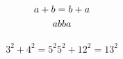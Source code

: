 \documentclass{article}
\begin{document}
    \begin{gather} %
            a+b = b+a \\
            ab ba \notag %

    \end{gather}

    \begin{gather*}
                3^2 + 4^2 = 5^2
                5^2 + 12^2 = 13^2
    \end{gather*}
    
    \begin{align} %
    
    \end{align}
    
\end{document}

